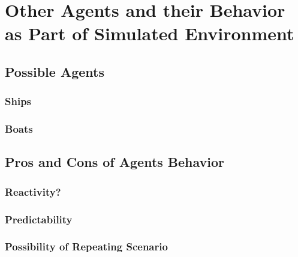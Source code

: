 \chapter{Other Agents and their Behavior as Part of Simulated Environment}

\section{Possible Agents}
\subsection{Ships}
\subsection{Boats}

\section{Pros and Cons of Agents Behavior}
\subsection{Reactivity?}
\subsection{Predictability}
\subsection{Possibility of Repeating Scenario}
